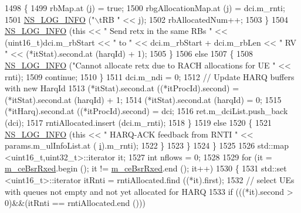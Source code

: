 \begin{DoxyCode}
1498                     \{
1499                       rbMap.at (j) = \textcolor{keyword}{true};
1500                       rbgAllocationMap.at (j) = dci.m\_rnti;
1501                       \hyperlink{group__logging_gafbd73ee2cf9f26b319f49086d8e860fb}{NS\_LOG\_INFO} (\textcolor{stringliteral}{"\(\backslash\)tRB "} << j);
1502                       rbAllocatedNum++;
1503                     \}
1504                   \hyperlink{group__logging_gafbd73ee2cf9f26b319f49086d8e860fb}{NS\_LOG\_INFO} (\textcolor{keyword}{this} << \textcolor{stringliteral}{" Send retx in the same RBs "} << (uint16\_t)dci.m\_rbStart 
      << \textcolor{stringliteral}{" to "} << dci.m\_rbStart + dci.m\_rbLen << \textcolor{stringliteral}{" RV "} << (*itStat).second.at (harqId) + 1);
1505                 \}
1506               \textcolor{keywordflow}{else}
1507                 \{
1508                   \hyperlink{group__logging_gafbd73ee2cf9f26b319f49086d8e860fb}{NS\_LOG\_INFO} (\textcolor{stringliteral}{"Cannot allocate retx due to RACH allocations for UE "} << rnti);
1509                   \textcolor{keywordflow}{continue};
1510                 \}
1511               dci.m\_ndi = 0;
1512               \textcolor{comment}{// Update HARQ buffers with new HarqId}
1513               (*itStat).second.at ((*itProcId).second) = (*itStat).second.at (harqId) + 1;
1514               (*itStat).second.at (harqId) = 0;
1515               (*itHarq).second.at ((*itProcId).second) = dci;
1516               ret.m\_dciList.push\_back (dci);
1517               rntiAllocated.insert (dci.m\_rnti);
1518             \}
1519           \textcolor{keywordflow}{else}
1520             \{
1521               \hyperlink{group__logging_gafbd73ee2cf9f26b319f49086d8e860fb}{NS\_LOG\_INFO} (\textcolor{keyword}{this} << \textcolor{stringliteral}{" HARQ-ACK feedback from RNTI "} << params.m\_ulInfoList.at (
      \hyperlink{bernuolliDistribution_8m_a6f6ccfcf58b31cb6412107d9d5281426}{i}).m\_rnti);
1522             \}
1523         \}
1524     \}
1525 
1526   std::map <uint16\_t,uint32\_t>::iterator it;
1527   \textcolor{keywordtype}{int} nflows = 0;
1528 
1529   \textcolor{keywordflow}{for} (it = \hyperlink{classns3_1_1FdBetFfMacScheduler_a86411f2dd593676d88de396ef4d0b6e5}{m\_ceBsrRxed}.begin (); it != \hyperlink{classns3_1_1FdBetFfMacScheduler_a86411f2dd593676d88de396ef4d0b6e5}{m\_ceBsrRxed}.end (); it++)
1530     \{
1531       std::set <uint16\_t>::iterator itRnti = rntiAllocated.find ((*it).first);
1532       \textcolor{comment}{// select UEs with queues not empty and not yet allocated for HARQ}
1533       \textcolor{keywordflow}{if} (((*it).second > 0)&&(itRnti == rntiAllocated.end ()))

\end{DoxyCode}

